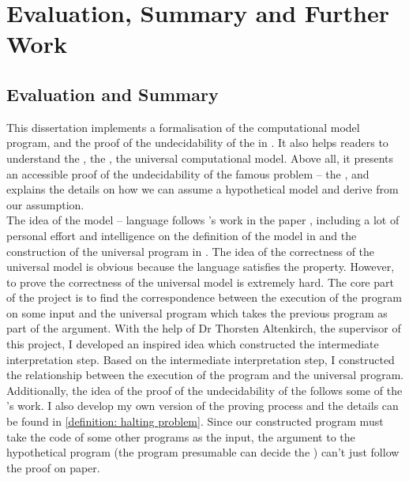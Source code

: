 \chapter{Evaluation, Summary and Further Work}

\section{Evaluation and Summary}\label{summary}
This dissertation implements a formalisation of the  computational model \WHILE program, and the proof of the undecidability of the  in .
It also helps readers to understand the , the , the universal computational model.
Above all, it presents an accessible proof of the undecidability of the famous problem -- the , and explains the details on how we can assume a hypothetical model and derive  from our assumption.\\
The idea of the  model -- \WHILE language follows 's work in the paper \cite{jones_computability_1997}, 
including a lot of personal effort and intelligence on the definition of the \WHILE model in \Agda and the construction of the universal \WHILE program in .
The idea of the correctness of the universal \WHILE model is obvious because the \WHILE language satisfies the  property.
However, to prove the correctness of the universal \WHILE model is extremely hard.
The core part of the project is to find the correspondence between the execution of the \WHILE program on some input and the universal \WHILE program which takes the previous program as part of the argument.
With the help of Dr Thorsten Altenkirch, the supervisor of this project, I developed an inspired idea which constructed the intermediate \Agda interpretation step.
Based on the intermediate \Agda interpretation step, I constructed the relationship between the execution of the \WHILE program and the universal \WHILE program.
Additionally, the idea of the proof of the undecidability of the  follows some of the 's work\cite{_halting_2015}.
I also develop my own version of the proving process and the details can be found in \ref{definition: halting problem}.
Since our constructed \WHILE program  must take the code of some other programs as the input, the argument to the hypothetical \WHILE program  (the program presumable can decide the ) can't just follow the proof on paper\cite{_halting_2015}.
